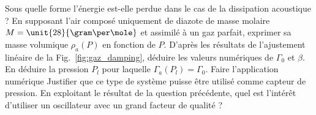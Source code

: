 \documentclass[12pt,a4paper]{exam}
\begin{document}
\begin{questions}
\question Sous quelle forme l'énergie est-elle perdue dans le cas de la dissipation acoustique ?
\question En supposant l'air composé uniquement de diazote de masse molaire $M=\unit{28}{\gram\per\mole}$ et assimilé à un gaz parfait, exprimer sa masse volumique $\rho_a(P)$ en fonction de $P$.
\question D'après les résultats de l'ajustement linéaire de la Fig.~\ref{fig:gaz_damping}, déduire les valeurs numériques de $\Gamma_0$ et $\beta$.
\question En déduire la pression $P_l$ pour laquelle $\Gamma_a(P_l)=\Gamma_0$.
Faire l'application numérique
\question Justifier que ce type de système puisse être utilisé comme capteur de pression.
En exploitant le résultat de la question précédente, quel est l'intérêt d'utiliser un oscillateur avec un grand facteur de qualité ?
\end{questions}
\end{document}

